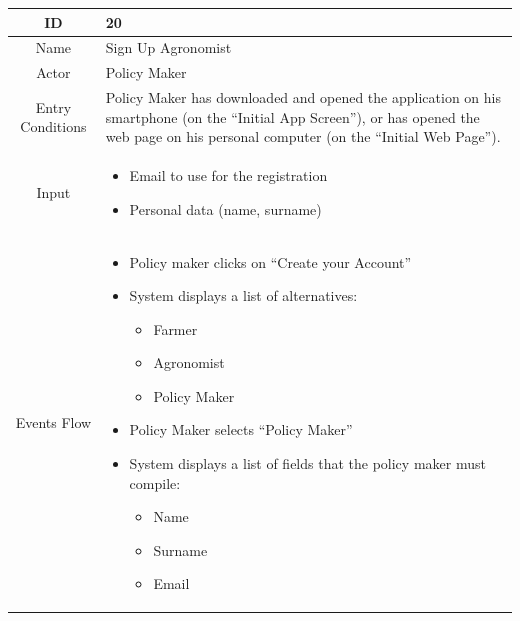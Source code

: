 \documentclass{article}
\begin{document}
\begin{center}
    
    
    
    \begin{longtable}{|c| p{10cm}|}
        \hline
            ID & 20 \\
        \hline
            Name & Sign Up Agronomist\\
        \hline
            Actor & Policy Maker \\
        \hline
            Entry Conditions & Policy Maker  has downloaded and opened the application on his smartphone (on the “Initial App Screen”), or has opened the web page on his personal computer (on the “Initial Web Page”).\\
        \hline
            Input & \begin{itemize}
                        \item Email to use for the registration
                        \item Personal data (name, surname)
                    \end{itemize}\\
        \hline
            Events Flow &   \begin{itemize}
                                \item Policy maker clicks on “Create your Account”
                                \item System displays a list of alternatives:
                                        \begin{itemize}
                                            \item Farmer
                                            \item Agronomist
                                            \item Policy Maker
                                        \end{itemize}
                                \item Policy Maker selects “Policy Maker”
                                \item System displays a list of fields that the policy maker must compile:
                                        \begin{itemize}
                                            \item Name
                                            \item Surname
                                            \item Email

\end{itemize}
\end{itemize}
\end{longtable}
\end{center}
\end{document}

